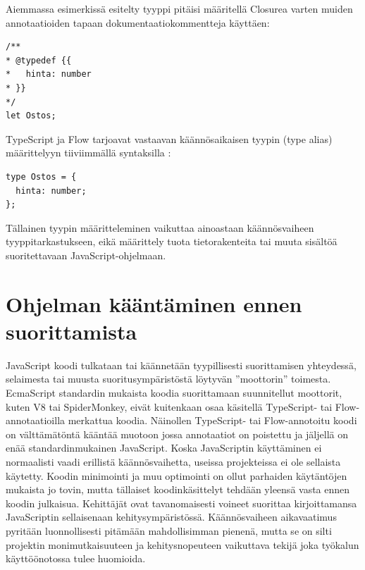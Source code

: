 \begin{minipage}{\linewidth}
Aiemmassa esimerkissä esitelty tyyppi  pitäisi
määritellä Closurea varten muiden annotaatioiden tapaan dokumentaatiokommentteja käyttäen:
\begin{lstlisting}[label={lst:closure_typedef}]
/**
* @typedef {{
*   hinta: number
* }}
*/
let Ostos;
\end{lstlisting}
\end{minipage}

TypeScript ja Flow tarjoavat vastaavan käännösaikaisen tyypin (type alias)
määrittelyyn tiiviimmällä syntaksilla \cite{TypeScriptSpec}:

\begin{minipage}{\linewidth}
\begin{lstlisting}[label={lst:ts_flow_type_alias}]
type Ostos = {
  hinta: number;
};
\end{lstlisting}
\end{minipage}
Tällainen tyypin määritteleminen vaikuttaa ainoastaan käännösvaiheen
tyyppitarkastukseen, eikä määrittely tuota tietorakenteita tai muuta
sisältöä suoritettavaan JavaScript-ohjelmaan.

\section{Ohjelman kääntäminen ennen suorittamista}

JavaScript koodi tulkataan tai käännetään tyypillisesti suorittamisen
yhteydessä, selaimesta tai muusta suoritusympäristöstä löytyvän ”moottorin”
toimesta. EcmaScript standardin mukaista koodia suorittamaan suunnitellut
moottorit, kuten V8 tai SpiderMonkey, eivät kuitenkaan osaa käsitellä
TypeScript- tai Flow-annotaatioilla merkattua koodia. Näinollen TypeScript-
tai Flow-annotoitu koodi on välttämätöntä kääntää muotoon jossa
annotaatiot on poistettu ja jäljellä on enää standardinmukainen JavaScript.
Koska JavaScriptin käyttäminen ei normaalisti vaadi erillistä
käännösvaihetta, useissa projekteissa ei ole sellaista käytetty. Koodin
minimointi ja muu optimointi on ollut parhaiden käytäntöjen mukaista jo
tovin, mutta tällaiset koodinkäsittelyt tehdään yleensä vasta ennen koodin
julkaisua. Kehittäjät ovat tavanomaisesti voineet suorittaa kirjoittamansa
JavaScriptin sellaisenaan kehitysympäristössä. Käännösvaiheen aikavaatimus
pyritään luonnollisesti pitämään mahdollisimman pienenä, mutta se on silti
projektin monimutkaisuuteen ja kehitysnopeuteen vaikuttava tekijä joka
työkalun käyttöönotossa tulee huomioida.

